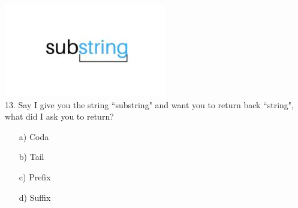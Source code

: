\documentclass[12pt]{article}
\begin{document}
\includegraphics[scale = 0.75]{substring.jpg}\\
13. Say I give you the string ``substring" and want you to return back ``string", what did I ask you to return?
\begin{enumerate}
    \item[a)]Coda
    \item[b)]Tail
    \item[c)]Prefix
    \item[d)]Suffix
\end{enumerate}
\end{document}
